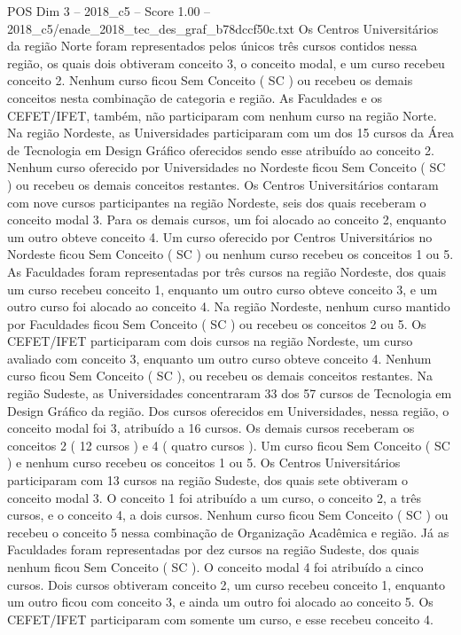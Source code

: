 \begin{textsample}{POS Dim 3 – 2018\_c5 – Score 1.00 – 2018\_c5/enade\_2018\_tec\_des\_graf\_b78dccf50c.txt}
Os Centros Universitários da região Norte foram representados pelos únicos três cursos contidos nessa região, os quais dois obtiveram conceito 3, o conceito modal, e um curso recebeu conceito 2.
Nenhum curso ficou Sem Conceito ( SC ) ou recebeu os demais conceitos nesta combinação de categoria e região.
As Faculdades e os CEFET/IFET, também, não participaram com nenhum curso na região Norte.
Na região Nordeste, as Universidades participaram com um dos 15 cursos da Área de Tecnologia em Design Gráfico oferecidos sendo esse atribuído ao conceito 2.
Nenhum curso oferecido por Universidades no Nordeste ficou Sem Conceito ( SC ) ou recebeu os demais conceitos restantes.
Os Centros Universitários contaram com nove cursos participantes na região Nordeste, seis dos quais receberam o conceito modal 3.
Para os demais cursos, um foi alocado ao conceito 2, enquanto um outro obteve conceito 4.
Um curso oferecido por Centros Universitários no Nordeste ficou Sem Conceito ( SC ) ou nenhum curso recebeu os conceitos 1 ou 5.
As Faculdades foram representadas por três cursos na região Nordeste, dos quais um curso recebeu conceito 1, enquanto um outro curso obteve conceito 3, e um outro curso foi alocado ao conceito 4.
Na região Nordeste, nenhum curso mantido por Faculdades ficou Sem Conceito ( SC ) ou recebeu os conceitos 2 ou 5.
Os CEFET/IFET participaram com dois cursos na região Nordeste, um curso avaliado com conceito 3, enquanto um outro curso obteve conceito 4.
Nenhum curso ficou Sem Conceito ( SC ), ou recebeu os demais conceitos restantes.
Na região Sudeste, as Universidades concentraram 33 dos 57 cursos de Tecnologia em Design Gráfico da região.
Dos cursos oferecidos em Universidades, nessa região, o conceito modal foi 3, atribuído a 16 cursos.
Os demais cursos receberam os conceitos 2 ( 12 cursos ) e 4 ( quatro cursos ).
Um curso ficou Sem Conceito ( SC ) e nenhum curso recebeu os conceitos 1 ou 5.
Os Centros Universitários participaram com 13 cursos na região Sudeste, dos quais sete obtiveram o conceito modal 3.
O conceito 1 foi atribuído a um curso, o conceito 2, a três cursos, e o conceito 4, a dois cursos.
Nenhum curso ficou Sem Conceito ( SC ) ou recebeu o conceito 5 nessa combinação de Organização Acadêmica e região.
Já as Faculdades foram representadas por dez cursos na região Sudeste, dos quais nenhum ficou Sem Conceito ( SC ).
O conceito modal 4 foi atribuído a cinco cursos.
Dois cursos obtiveram conceito 2, um curso recebeu conceito 1, enquanto um outro ficou com conceito 3, e ainda um outro foi alocado ao conceito 5.
Os CEFET/IFET participaram com somente um curso, e esse recebeu conceito 4.

\end{textsample}
